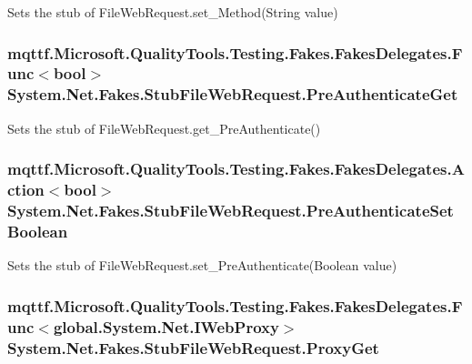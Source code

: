 Sets the stub of File\-Web\-Request.\-set\-\_\-\-Method(\-String value)

\hypertarget{class_system_1_1_net_1_1_fakes_1_1_stub_file_web_request_a4103e387ddeb7cc4ea9400a70fa5d013}{
\subsubsection[{Pre\-Authenticate\-Get}]{\setlength{\rightskip}{0pt plus 5cm}mqttf.\-Microsoft.\-Quality\-Tools.\-Testing.\-Fakes.\-Fakes\-Delegates.\-Func$<$bool$>$ System.\-Net.\-Fakes.\-Stub\-File\-Web\-Request.\-Pre\-Authenticate\-Get}}\label{class_system_1_1_net_1_1_fakes_1_1_stub_file_web_request_a4103e387ddeb7cc4ea9400a70fa5d013}


Sets the stub of File\-Web\-Request.\-get\-\_\-\-Pre\-Authenticate()

\hypertarget{class_system_1_1_net_1_1_fakes_1_1_stub_file_web_request_a071bd05d3a5af8e6bac91668c14df07a}{
\subsubsection[{Pre\-Authenticate\-Set\-Boolean}]{\setlength{\rightskip}{0pt plus 5cm}mqttf.\-Microsoft.\-Quality\-Tools.\-Testing.\-Fakes.\-Fakes\-Delegates.\-Action$<$bool$>$ System.\-Net.\-Fakes.\-Stub\-File\-Web\-Request.\-Pre\-Authenticate\-Set\-Boolean}}\label{class_system_1_1_net_1_1_fakes_1_1_stub_file_web_request_a071bd05d3a5af8e6bac91668c14df07a}


Sets the stub of File\-Web\-Request.\-set\-\_\-\-Pre\-Authenticate(\-Boolean value)

\hypertarget{class_system_1_1_net_1_1_fakes_1_1_stub_file_web_request_ad9350264dccf2f759a26cad88d315c03}{
\subsubsection[{Proxy\-Get}]{\setlength{\rightskip}{0pt plus 5cm}mqttf.\-Microsoft.\-Quality\-Tools.\-Testing.\-Fakes.\-Fakes\-Delegates.\-Func$<$global.\-System.\-Net.\-I\-Web\-Proxy$>$ System.\-Net.\-Fakes.\-Stub\-File\-Web\-Request.\-Proxy\-Get}}\label{class_system_1_1_net_1_1_fakes_1_1_stub_file_web_request_ad9350264dccf2f759a26cad88d315c03}


